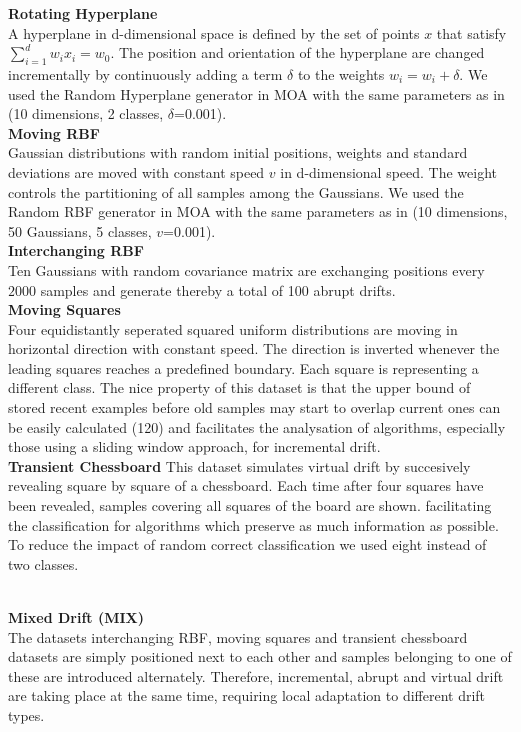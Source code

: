 \documentclass[conference]{IEEEtran}
\begin{document}
\textbf{Rotating Hyperplane}\\
A hyperplane in d-dimensional space is defined by the set of points $x$ that satisfy $\sum_{i=1}^{d}w_ix_i=w_0$. The position and orientation of the hyperplane
are changed incrementally by continuously adding a term $\delta$ to the weights $w_i=w_i+\delta$. 
We used the Random Hyperplane generator in MOA with the same parameters as in \cite{Bifet:2013:EDS:2480362.2480516} (10 dimensions, 2 classes, $\delta$=0.001).\\ 
\textbf{Moving RBF}\\
Gaussian distributions with random initial positions, weights and standard deviations are moved with constant speed $v$ in d-dimensional speed. 
The weight controls the partitioning of all samples among the Gaussians.
We used the Random RBF generator in MOA with the same parameters as in \cite{Bifet:2013:EDS:2480362.2480516} (10 dimensions, 50 Gaussians, 5 classes, $v$=0.001).\\ 
\textbf{Interchanging RBF}\\
Ten Gaussians with random covariance matrix are exchanging positions every $2000$ samples and generate thereby a total of 100 abrupt drifts.\\ 
\textbf{Moving Squares}\\
Four equidistantly seperated squared uniform distributions are moving in horizontal direction with constant speed. The direction is inverted whenever the leading squares reaches a predefined boundary.
Each square is representing a different class. 
The nice property of this dataset is that the upper bound of stored recent examples before old samples may start to  overlap current ones can be easily calculated (120) and  
facilitates the analysation of algorithms, especially those using a sliding window approach, for incremental drift.\\
\textbf{Transient Chessboard}
This dataset simulates virtual drift by succesively revealing square by square of a chessboard. 
Each time after four squares have been revealed, samples covering all squares of the board are shown.
facilitating the classification for algorithms which preserve as much information as possible. To reduce the impact of random correct classification we used eight instead of two classes.

\\ 
\textbf{Mixed Drift (MIX)} \\
The datasets interchanging RBF, moving squares and transient chessboard datasets are simply positioned next to each other and samples belonging to one of these are introduced alternately.
Therefore, incremental, abrupt and virtual drift are taking place at the same time, requiring local adaptation to different drift types.\\
\end{document}
